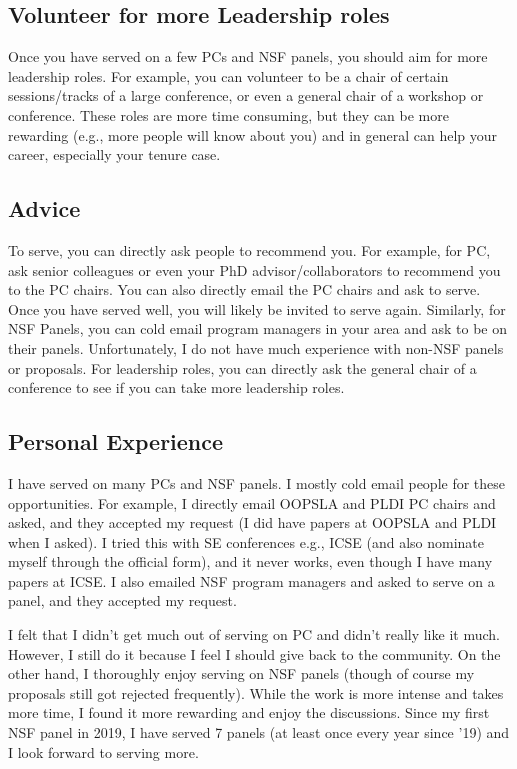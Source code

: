 \documentclass[oneside,11pt,dvipsnames]{book}
\begin{document}
\subsection{Volunteer for more Leadership roles} Once you have served on a few PCs and NSF panels, you should aim for more leadership roles.  For example, you can volunteer to be a chair of certain sessions/tracks of a large conference, or even a general chair of a workshop or conference.  These roles are more time consuming, but they can be more rewarding (e.g., more people will know about you) and in general can help your career, especially your tenure case.


\subsection{Advice} To serve, you can directly ask people to recommend you. For example, for PC, ask senior colleagues or even your PhD advisor/collaborators to recommend you to the PC chairs. You can also directly email the PC chairs and ask to serve.  Once you have served well, you will likely be invited to serve again.  
Similarly, for NSF Panels, you can cold email program managers in your area and ask to be on their panels.  Unfortunately, I do not have much experience with non-NSF panels or proposals. For leadership roles, you can directly ask the general chair of a conference to see if you can take more leadership roles.

\subsection{Personal Experience} I have served on many PCs and NSF panels. I mostly cold email people for these opportunities. For example, I directly email OOPSLA and PLDI PC chairs and asked, and they accepted my request (I did have papers at OOPSLA and PLDI when I asked). I tried this with SE conferences  e.g., ICSE (and also nominate myself through the official form), and it never works, even though I have many papers at ICSE.
I also emailed NSF program managers and asked to serve on a panel, and they accepted my request.


I felt that I didn't get much out of serving on PC and didn't really like it much. However, I still do it because I feel I should give back to the community.
On the other hand, I thoroughly enjoy serving on NSF panels (though of course my proposals still got rejected frequently). While the work is more intense and takes more time, I found it more rewarding and enjoy the discussions. Since my first NSF panel in 2019, I have served 7 panels (at least once every year since '19) and I look forward to serving more.
\end{document}
